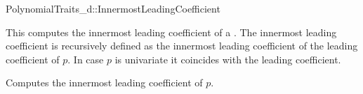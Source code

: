 \begin{ccRefConcept}{PolynomialTraits_d::InnermostLeadingCoefficient}

\ccDefinition

This  computes the innermost leading coefficient
of a . The innermost leading coefficient is recursively defined as the innermost leading coefficient of the leading coefficient of $p$. In case $p$ is univariate it coincides with the leading coefficient. 

\ccRefines 
{}

\ccTypes
{}
\ccGlue
{}
\ccGlue

\ccOperations
{}
         {Computes the innermost leading coefficient of $p$.}

 
\ccSeeAlso

\\

\end{ccRefConcept}
